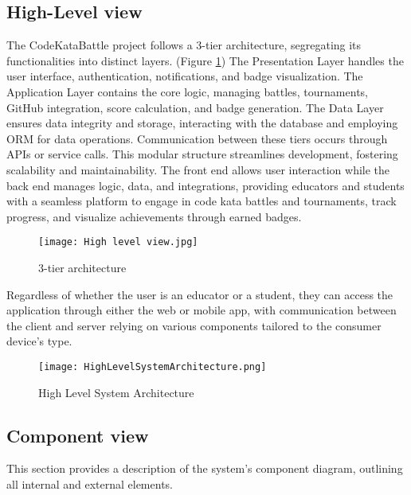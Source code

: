 \documentclass{article}
\begin{document}
\subsection{High-Level view}

The CodeKataBattle project follows a 3-tier architecture, segregating its functionalities into distinct layers. (Figure \ref{fig:3-tier}) The Presentation Layer handles the user interface, authentication, notifications, and badge visualization. The Application Layer contains the core logic, managing battles, tournaments, GitHub integration, score calculation, and badge generation. The Data Layer ensures data integrity and storage, interacting with the database and employing ORM for data operations. Communication between these tiers occurs through APIs or service calls. This modular structure streamlines development, fostering scalability and maintainability. The front end allows user interaction while the back end manages logic, data, and integrations, providing educators and students with a seamless platform to engage in code kata battles and tournaments, track progress, and visualize achievements through earned badges.

\begin{figure}[H]
    \centering
    \texttt{[image: High level view.jpg]}
    \caption{3-tier architecture}
    \label{fig:3-tier}
\end{figure}

Regardless of whether the user is an educator or a student, they can access the application through either the web or mobile app, with communication between the client and server relying on various components tailored to the consumer device's type.

\begin{figure}[H]
    \centering
    \texttt{[image: HighLevelSystemArchitecture.png]}
    \caption{High Level System Architecture}
\end{figure}
\newpage

\subsection{Component view}
This section provides a description of the system's component diagram, outlining all internal and external elements.
\end{document}
